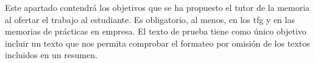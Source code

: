 \indent Este apartado contendr\'a los objetivos que se ha propuesto el tutor de la memoria al ofertar el trabajo al estudiante. Es obligatorio, al menos, en los tfg y en las memorias de pr\'acticas en empresa. El texto de prueba tiene como \'unico
objetivo incluir un texto que nos permita comprobar el formateo por
omisi\'on de los textos incluidos en un resumen.
